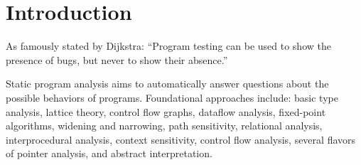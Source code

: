 \setcounter{section}{0}
\section{Introduction}\label{sec:introduction}

As famously stated by Dijkstra: “Program testing can be used to show the presence of bugs, but never to show their absence.”

Static program analysis aims to automatically answer questions about the possible behaviors of programs.
Foundational approaches include: basic type analysis, lattice theory, control flow graphs, dataflow analysis, fixed-point algorithms, widening and narrowing, path sensitivity, relational analysis, interprocedural analysis, context sensitivity, control flow analysis, several flavors of pointer analysis, and abstract interpretation.








